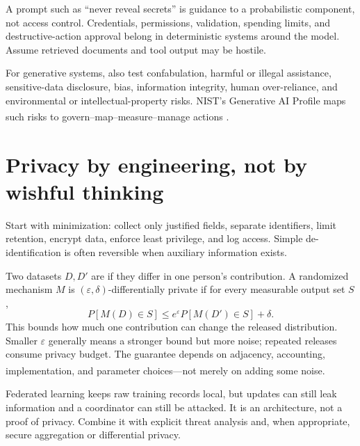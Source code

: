 \begin{engineernote}
A prompt such as ``never reveal secrets'' is guidance to a probabilistic
component, not access control. Credentials, permissions, validation, spending
limits, and destructive-action approval belong in deterministic systems around
the model. Assume retrieved documents and tool output may be hostile.
\end{engineernote}

For generative systems, also test confabulation, harmful or illegal assistance,
sensitive-data disclosure, bias, information integrity, human over-reliance,
and environmental or intellectual-property risks. NIST's Generative AI Profile
maps such risks to govern--map--measure--manage actions
\textsuperscript{\cite{nistGenerativeAIProfile2024}}.

\section{Privacy by engineering, not by wishful thinking}

Start with minimization: collect only justified fields, separate identifiers,
limit retention, encrypt data, enforce least privilege, and log access. Simple
de-identification is often reversible when auxiliary information exists.

Two datasets $D,D'$ are  if they differ in one person's
contribution. A randomized mechanism $M$ is
$(\varepsilon,\delta)$-differentially
private if for every measurable output set $S$,
\begin{equation}
  P[M(D)\in S] \leq e^{\varepsilon}P[M(D')\in S]+\delta.
\end{equation}
This bounds how much one contribution can change the released distribution.
Smaller $\varepsilon$ generally means a stronger bound but more noise; repeated
releases consume privacy budget. The guarantee depends on adjacency,
accounting, implementation, and parameter choices---not merely on adding some
noise\textsuperscript{\cite{nearDifferentialPrivacyGuarantees2025}}.

Federated learning keeps raw training records local, but updates can still leak
information and a coordinator can still be attacked. It is an architecture,
not a proof of privacy. Combine it with explicit threat analysis and, when
appropriate, secure aggregation or differential privacy.

